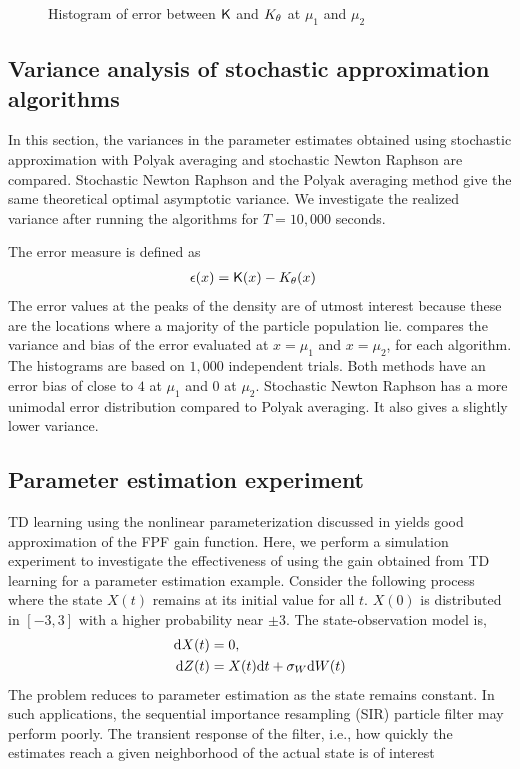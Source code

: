 \begin{figure}[h]
	\caption{ Histogram of error between $\text{\sf K}$ and $K_\theta$ at $\mu_{1}$ and $\mu_{2}$ }
	\label{var_snr_1}
	\vspace{-.15cm}
\end{figure}

\subsection{Variance analysis of stochastic approximation algorithms}
\label{asym_variance}
In this section, the variances in the parameter estimates obtained using stochastic approximation with Polyak averaging and stochastic Newton Raphson are compared. Stochastic Newton Raphson and the Polyak averaging method give the same theoretical optimal asymptotic variance. We investigate the realized variance after running the algorithms for $T=10,000$ seconds.

The error measure is defined as
\begin{equation*}
\begin{aligned}
\epsilon(x) &= \text{\sf K}(x)-K_\theta(x)
\end{aligned}
\end{equation*}
The error values at the peaks of the density are of utmost interest because these are the locations where a majority of the particle population lie.   compares the variance and bias of the error evaluated at $x=\mu_{1}$ and $x=\mu_{2}$, for each algorithm. The histograms are based on $1,000$ independent trials. Both methods have an error bias of close to $4$ at $\mu_{1}$ and $0$ at $\mu_{2}$. Stochastic Newton Raphson has a more unimodal error distribution compared to Polyak averaging. It also gives a slightly lower variance.




\subsection{Parameter estimation experiment}


TD learning using the nonlinear parameterization discussed in  yields good approximation of the FPF gain function. Here, we perform a simulation experiment to investigate the effectiveness of using the gain obtained from TD learning for a parameter estimation example. Consider the following process where the state $X(t)$ remains at its initial value for all $t$. $X(0)$ is distributed in $[-3,3]$ with a higher probability near $\pm3$. The state-observation model is,
\begin{equation*}
\begin{aligned}
\text{d} X(t)&=0,\quad \\
\text{d} Z(t)&= X(t) \text{d} t+\sigma_{W}\text{d} W(t)
\end{aligned}
\end{equation*}
The problem reduces to parameter estimation as the state remains constant. In such applications, the sequential importance resampling (SIR) particle filter may perform poorly. The transient response of the filter, i.e., how quickly the estimates reach a given neighborhood of the actual state is of interest
